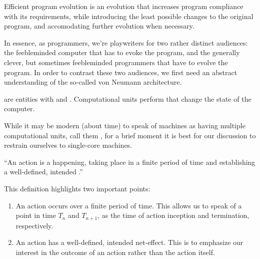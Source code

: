 \begin{definition}

Efficient program evolution is an evolution that increases program compliance
with its requirements, while introducing the least possible changes to the
original program, and accomodating further evolution when necessary.

\end{definition}

In essence, as programmers, we're playwriters for two rather distinct
audiences: the feebleminded computer that has to evoke the program, and the
generally clever, but sometimes feebleminded programmers that have to evolve
the program. In order to contrast these two audiences, we first need an
abstract understanding of the so-called von Neumann architecture.

\begin{definition}

 are entities with  and .
Computational units perform  that change the state of the
computer.

\end{definition}

While it may be modern (about time) to speak of machines as having multiple
computational units, call them , for a brief moment it is best for
our discussion to restrain ourselves to single-core machines.

\begin{definition}

``An action is a happening, taking place in a finite period of time and
establishing a well-defined, intended .''
\cite{dijkstra-introduction}

\end{definition}

This definition highlights two important points:

\begin{enumerate}

\item An action occurs over a finite period of time. This allows us to speak of
a point in time $T_n$ and $T_{n+1}$, as the time of action inception and
termination, respectively.

\item An action has a well-defined, intended net-effect. This is to emphasize
our interest in the outcome of an action rather than the action itself.

\end{enumerate}

